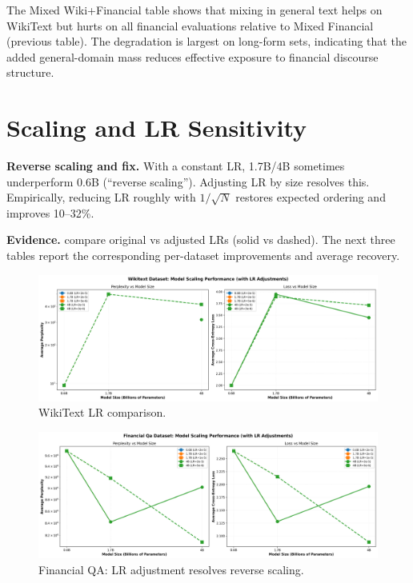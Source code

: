 The Mixed Wiki+Financial table shows that mixing in general text helps on WikiText but hurts on all financial evaluations relative to Mixed Financial (previous table). The degradation is largest on long-form sets, indicating that the added general-domain mass reduces effective exposure to financial discourse structure.

\section{Scaling and LR Sensitivity}
\textbf{Reverse scaling and fix.} With a constant LR, 1.7B/4B sometimes underperform 0.6B (``reverse scaling''). Adjusting LR by size resolves this. Empirically, reducing LR roughly with $1/\sqrt{N}$ restores expected ordering and improves 10--32\%.

\textbf{Evidence.}  compare original vs adjusted LRs (solid vs dashed). The next three tables report the corresponding per-dataset improvements and average recovery.

\begin{figure}[H]
  \centering
  \includegraphics[width=\textwidth]{../thesis/figures/scaling_wikitext.png}
  \caption{WikiText LR comparison.}\label{fig:scaling_wikitext}
\end{figure}

{\tighttable
}

\begin{figure}[H]
  \centering
  \includegraphics[width=\textwidth]{../thesis/figures/scaling_financial_qa.png}
  \caption{Financial QA: LR adjustment resolves reverse scaling.}\label{fig:scaling_financial_qa}
\end{figure}

